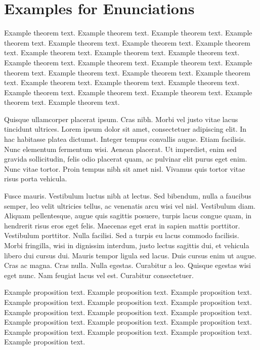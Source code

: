 \documentclass[ASNA,twocolumn]{USG} %
\begin{document}
\section{Examples for Enunciations}\label{sec4}

\begin{theorem}\label{thm1}
Example theorem text. Example theorem text. Example theorem text. Example theorem text. Example theorem text. Example theorem text. Example theorem text. Example theorem text. Example theorem text. Example theorem text. Example theorem text. Example theorem text. Example theorem text. Example theorem text. Example theorem text. Example theorem text. Example theorem text. Example theorem text. Example theorem text. Example theorem text. Example theorem text. Example theorem text. Example theorem text. Example theorem text. Example theorem text.
\end{theorem}

Quisque ullamcorper placerat ipsum. Cras nibh. Morbi vel justo vitae lacus tincidunt ultrices. Lorem ipsum dolor sit
amet, consectetuer adipiscing elit. In hac habitasse platea dictumst. Integer tempus convallis augue. Etiam facilisis.
Nunc elementum fermentum wisi. Aenean placerat. Ut imperdiet, enim sed gravida sollicitudin, felis odio placerat
quam, ac pulvinar elit purus eget enim. Nunc vitae tortor. Proin tempus nibh sit amet nisl. Vivamus quis tortor
vitae risus porta vehicula.

Fusce mauris. Vestibulum luctus nibh at lectus. Sed bibendum, nulla a faucibus semper, leo velit ultricies tellus, ac
venenatis arcu wisi vel nisl. Vestibulum diam. Aliquam pellentesque, augue quis sagittis posuere, turpis lacus congue
quam, in hendrerit risus eros eget felis. Maecenas eget erat in sapien mattis porttitor. Vestibulum porttitor. Nulla
facilisi. Sed a turpis eu lacus commodo facilisis. Morbi fringilla, wisi in dignissim interdum, justo lectus sagittis dui, et
vehicula libero dui cursus dui. Mauris tempor ligula sed lacus. Duis cursus enim ut augue. Cras ac magna. Cras nulla.
Nulla egestas. Curabitur a leo. Quisque egestas wisi eget nunc. Nam feugiat lacus vel est. Curabitur consectetuer.

\begin{proposition}
Example proposition text. Example proposition text. Example proposition text. Example proposition text. Example proposition text. Example proposition text. Example proposition text. Example proposition text. Example proposition text. Example proposition text. Example proposition text. Example proposition text. Example proposition text. Example proposition text. Example proposition text. Example proposition text.
\end{proposition}
\end{document}
